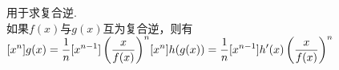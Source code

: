 用于求复合逆. \\
如果$f(x)$与$g(x)$互为复合逆，则有 \\
\begin{math}
\begin{aligned}[x^n]g(x)=\frac{1}{n}[x^{n-1}]\left(\frac{x}{f(x)}\right)^n\end{aligned} \\
\begin{aligned}[x^n]h(g(x))=\frac{1}{n}[x^{n-1}]h'(x)\left(\frac{x}{f(x)}\right)^n\end{aligned}
\end{math}